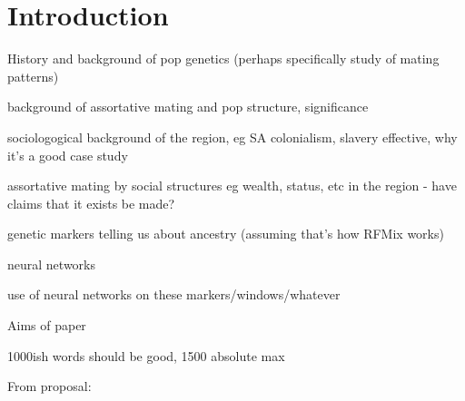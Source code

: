 \documentclass[11pt]{article}
\begin{document}
\section{Introduction}

History and background of pop genetics (perhaps specifically study of mating patterns)

background of assortative mating and pop structure, significance

sociologogical background of the region, eg SA colonialism, slavery effective, why it's a good case study

assortative mating by social structures eg wealth, status, etc in the region - have claims that it exists be made?

genetic markers telling us about ancestry (assuming that's how RFMix works)



neural networks

use of neural networks on these markers/windows/whatever



Aims of paper






1000ish words should be good, 1500 absolute max



From proposal: 
\end{document}

